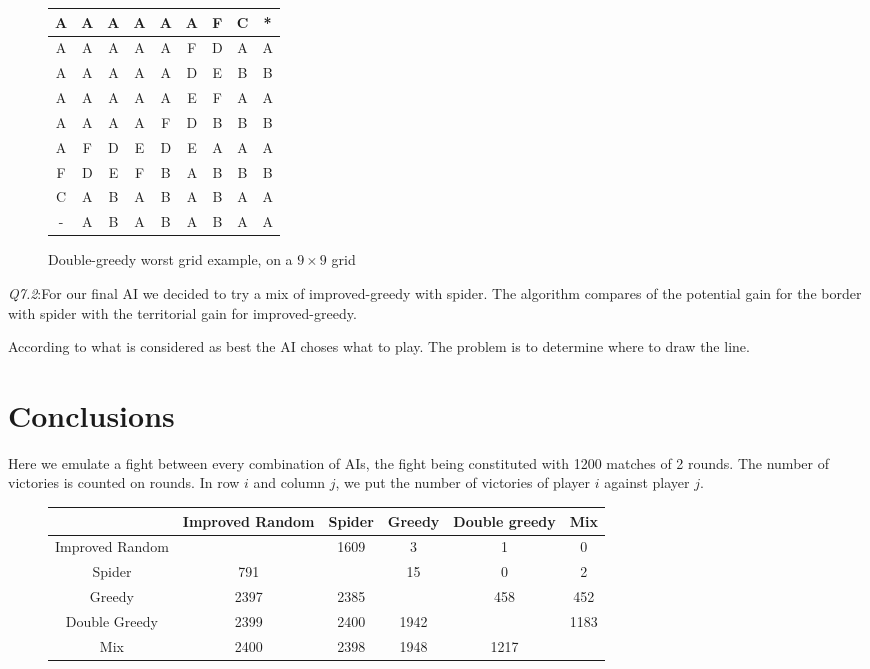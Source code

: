 \documentclass[a4paper]{article}
\begin{document}
 \begin{figure}
 \begin{center}
 \begin{tabular}{|c|c|c|c|c|c|c|c|c|}
 \hline
 	A & A & A & A & A & A & F & C & * \\
 \hline
  	A & A & A & A & A & F & D & A & A \\
 \hline
  	A & A & A & A & A & D & E & B & B \\
 \hline
  	A & A & A & A & A & E & F & A & A \\
 \hline
  	A & A & A & A & F & D & B & B & B \\
 \hline
  	A & F & D & E & D & E & A & A & A \\
 \hline
  	F & D & E & F & B & A & B & B & B \\
 \hline
  	C & A & B & A & B & A & B & A & A \\
 \hline
  	- & A & B & A & B & A & B & A & A \\
  \hline
 \end{tabular}
 \end{center}
 \caption{Double-greedy worst grid example, on a $9 \times 9$ grid}
 \end{figure}

\emph{Q7.2}:For our final AI we decided to try a mix of improved-greedy with spider. The algorithm compares of the potential gain
 for the border with spider with the territorial gain for improved-greedy.
 
 According to what is considered as best the AI choses what to play. The problem is to determine where to draw the line.
 
\section{Conclusions}

Here we emulate a fight between every combination of AIs, the fight being constituted with 1200 matches of 2 rounds. \newline
The number of victories is counted on rounds. In row $i$ and column $j$, we put the number of victories of player $i$ against player $j$.\newline

\begin{figure}[b]
\begin{center}
\begin{tabular}{|c|c|c|c|c|c|}
  \hline
   & Improved Random & Spider & Greedy & Double greedy & Mix  \\
  \hline
  Improved Random && 1609 & 3 & 1 & 0\\
  \hline
  Spider & 791 && 15 & 0 & 2\\
  \hline
  Greedy & 2397 & 2385 && 458 & 452\\
  \hline
  Double Greedy & 2399 & 2400 & 1942 && 1183 \\
  \hline
  Mix & 2400 & 2398 & 1948 & 1217 &\\
  \hline
\end{tabular}
\end{center}
\end{figure}
\end{document}
